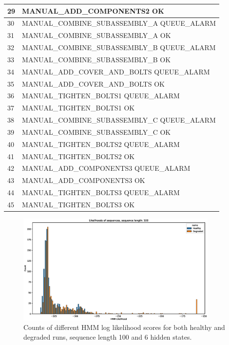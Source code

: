 \documentclass[journal]{IEEEtran}
\begin{document}
\begin{table}[!t]
\begin{tabular}{|p{5mm}|p{55mm}|}
29 & MANUAL\_ADD\_COMPONENTS2 OK \\
\hline
30 & MANUAL\_COMBINE\_SUBASSEMBLY\_A QUEUE\_ALARM \\
\hline
31 & MANUAL\_COMBINE\_SUBASSEMBLY\_A OK \\
\hline
32 & MANUAL\_COMBINE\_SUBASSEMBLY\_B QUEUE\_ALARM \\
\hline
33 & MANUAL\_COMBINE\_SUBASSEMBLY\_B OK \\
\hline
34 & MANUAL\_ADD\_COVER\_AND\_BOLTS QUEUE\_ALARM \\
\hline
35 & MANUAL\_ADD\_COVER\_AND\_BOLTS OK \\
\hline
36 & MANUAL\_TIGHTEN\_BOLTS1 QUEUE\_ALARM \\
\hline
37 & MANUAL\_TIGHTEN\_BOLTS1 OK \\
\hline
38 & MANUAL\_COMBINE\_SUBASSEMBLY\_C QUEUE\_ALARM \\
\hline
39 & MANUAL\_COMBINE\_SUBASSEMBLY\_C OK \\
\hline
40 & MANUAL\_TIGHTEN\_BOLTS2 QUEUE\_ALARM \\
\hline
41 & MANUAL\_TIGHTEN\_BOLTS2 OK \\
\hline
42 & MANUAL\_ADD\_COMPONENTS3 QUEUE\_ALARM \\
\hline
43 & MANUAL\_ADD\_COMPONENTS3 OK \\
\hline
44 & MANUAL\_TIGHTEN\_BOLTS3 QUEUE\_ALARM \\
\hline
45 & MANUAL\_TIGHTEN\_BOLTS3 OK \\
\hline
\end{tabular}
\end{table}

\begin{figure}[tb]
 \centering
 \includegraphics[width=10cm,keepaspectratio=true]{./hmm_histograms_100.eps}
 \caption{Counts of different HMM log likelihood scores for both healthy and degraded runs, sequence length 100 and 6 hidden states.}
 \label{figure:log_likelihood_100}
\end{figure}
\end{document}
